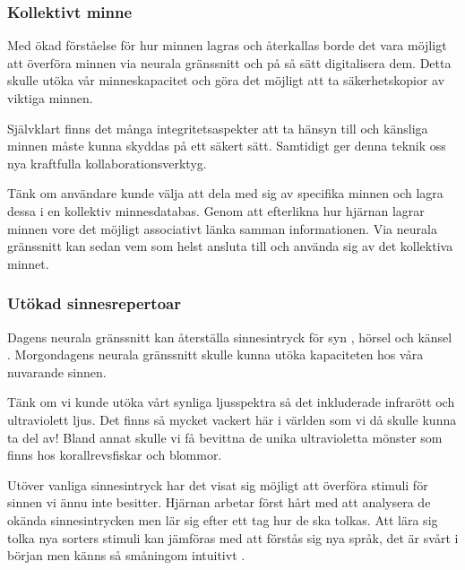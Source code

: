 \documentclass[12pt, a4paper]{article}
\begin{document}
%
%

\subsubsection{Kollektivt minne}

Med ökad förståelse för hur minnen lagras och återkallas borde det vara möjligt
att överföra minnen via neurala gränssnitt och på så sätt digitalisera dem.
Detta skulle utöka vår minneskapacitet och göra det möjligt att ta
säkerhetskopior av viktiga minnen.

Självklart finns det många integritetsaspekter att ta hänsyn till och känsliga
minnen måste kunna skyddas på ett säkert sätt. Samtidigt ger denna teknik oss
nya kraftfulla kollaborationsverktyg.

Tänk om användare kunde välja att dela med sig av specifika minnen och lagra
dessa i en kollektiv minnesdatabas. Genom att efterlikna hur hjärnan lagrar
minnen vore det möjligt associativt länka samman informationen. Via neurala
gränssnitt kan sedan vem som helst ansluta till och använda sig av det
kollektiva minnet.


\subsubsection{Utökad sinnesrepertoar}

Dagens neurala gränssnitt kan återställa sinnesintryck för syn \cite{sight1},
hörsel \cite{sound} och känsel \cite{touch}. Morgondagens neurala gränssnitt
skulle kunna utöka kapaciteten hos våra nuvarande sinnen.

Tänk om vi kunde utöka vårt synliga ljusspektra så det inkluderade infrarött och
ultraviolett ljus. Det finns så mycket vackert här i världen som vi då skulle
kunna ta del av! Bland annat skulle vi få bevittna de unika ultravioletta
mönster som finns hos korallrevsfiskar \cite{uv_patterns} och blommor.

Utöver vanliga sinnesintryck har det visat sig möjligt att överföra stimuli för
sinnen vi ännu inte besitter. Hjärnan arbetar först hårt med att analysera de
okända sinnesintrycken men lär sig efter ett tag hur de ska tolkas. Att lära sig
tolka nya sorters stimuli kan jämföras med att förstås sig nya språk, det är
svårt i början men känns så småningom intuitivt \cite{learn_sense}.
\end{document}
